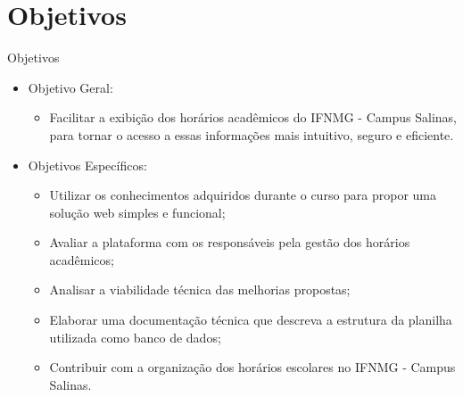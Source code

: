 \section{Objetivos}

\begin{frame}{Objetivos}
    \begin{itemize}
        \item Objetivo Geral: \vspace{0.1cm}
              \begin{itemize}
                  \item Facilitar a exibição dos horários acadêmicos do IFNMG - Campus Salinas, para tornar o acesso a essas informações mais intuitivo, seguro e eficiente. \vspace{0.1cm}
              \end{itemize}
        \item Objetivos Específicos: \vspace{0.1cm}
              \begin{itemize}
                  \item Utilizar os conhecimentos adquiridos durante o curso para propor uma solução web simples e funcional; \vspace{0.1cm}
                  \item Avaliar a plataforma com os responsáveis pela gestão dos horários acadêmicos; \vspace{0.1cm}
                  \item Analisar a viabilidade técnica das melhorias propostas; \vspace{0.1cm}
                  \item Elaborar uma documentação técnica que descreva a estrutura da planilha utilizada como banco de dados; \vspace{0.1cm}
                  \item Contribuir com a organização dos horários escolares no IFNMG - Campus Salinas. \vspace{0.1cm}
              \end{itemize}
    \end{itemize}
\end{frame}